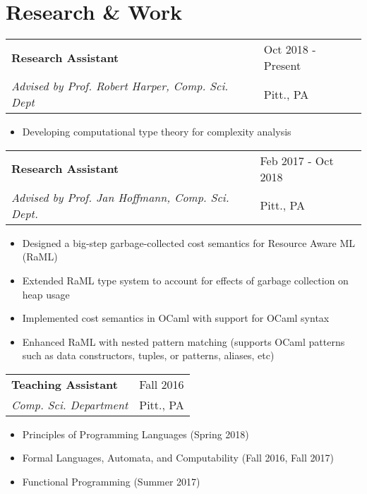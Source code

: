 \documentclass[12pt]{article}
\begin{document}
\section{Research \& Work}
\begin{tabu}{@{}l   X[r] }
  \textbf{Research Assistant} & Oct 2018 - Present\\
\emph{Advised by Prof. Robert Harper, Comp. Sci. Dept} & Pitt., PA
\end{tabu}
\vspace{-5pt}

\begin{itemize}
\itemsep-2pt
\item Developing computational type theory for complexity analysis
\end{itemize}

\begin{tabu}{@{}l X[r]  }
  \bfseries{Research Assistant} &  Feb 2017 - Oct 2018\\
\emph{Advised by Prof. Jan Hoffmann, Comp. Sci. Dept.} &Pitt., PA 
\end{tabu}
\vspace{-5pt}

\begin{itemize}
\itemsep-2pt
\item Designed a big-step garbage-collected cost semantics for Resource Aware ML (RaML)
\item Extended RaML type system to account for effects of garbage collection on heap usage
\item Implemented cost semantics in OCaml with support for OCaml syntax
\item Enhanced RaML with nested pattern matching (supports OCaml patterns such as data constructors, tuples, or patterns, aliases, etc)
\end{itemize}

\newpage
\begin{tabu}{@{}l  X[r]}
  \bfseries{Teaching Assistant} & Fall 2016\\
\emph{Comp. Sci. Department} & Pitt., PA
\end{tabu}
\vspace{-5pt}

\begin{itemize}
\itemsep-2pt
\item Principles of Programming Languages (Spring 2018)
\item Formal Languages, Automata, and Computability (Fall 2016, Fall 2017)
\item Functional Programming (Summer 2017)
\end{itemize}
\end{document}
